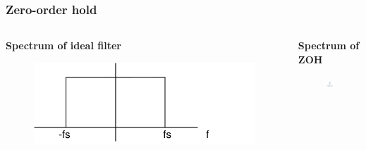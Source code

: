 \begin{frame}
	\frametitle{Zero-order hold}
	\begin{columns}
		\begin{column}{0.5\textwidth}
		\textbf{Spectrum of ideal filter}
		\vspace{8ex}
		\begin{figure}
			\includegraphics[width=1\linewidth]{spectrum_ideal}
		\end{figure}
		\end{column}
		\begin{column}{0.5\textwidth}
		\textbf{Spectrum of ZOH}
		\begin{figure}
			\includegraphics[width=0.8\linewidth]{spectrum_zoh}
		\end{figure}
		\end{column}
	\end{columns}
\end{frame}

